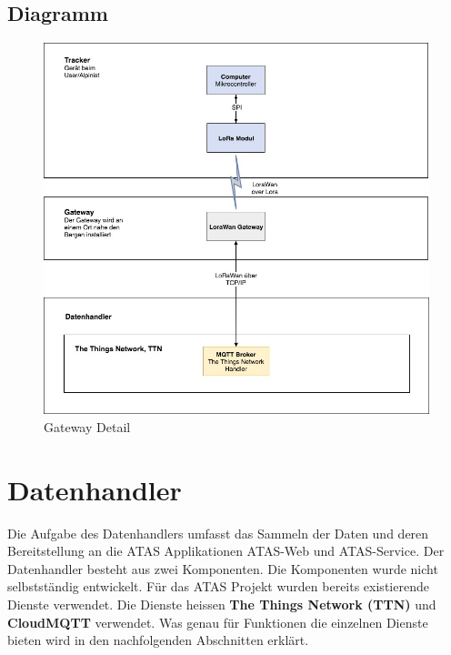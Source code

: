\documentclass[11pt,english,german]{report}
\theoremstyle{definition}
\begin{document}
\subsection{Diagramm}
\begin{figure}[H]
	\centering
	\includegraphics[width=\textwidth]{img/system/ATAS_SystemOverview_Detail_Gateway_BA.jpg}
	\caption[Gateway Detail]
	{Gateway Detail}
\end{figure}

\newpage
\section{Datenhandler}
Die Aufgabe des Datenhandlers umfasst das Sammeln der Daten und deren Bereitstellung an die ATAS Applikationen ATAS-Web und ATAS-Service. Der Datenhandler besteht aus zwei Komponenten. Die Komponenten wurde nicht selbstständig entwickelt. Für das ATAS Projekt wurden bereits existierende Dienste verwendet. Die Dienste heissen \textbf{The Things Network (TTN)} und \textbf{CloudMQTT} verwendet. Was genau für Funktionen die einzelnen Dienste bieten wird in den nachfolgenden Abschnitten erklärt.
\end{document}
